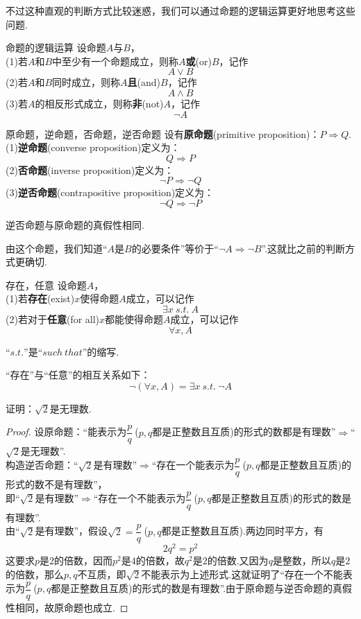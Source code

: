 \documentclass[lang=cn, zihao=4.5]{elegantbook}
\begin{document}
不过这种直观的判断方式比较迷惑，我们可以通过命题的逻辑运算更好地思考这些问题.

\begin{definition}{命题的逻辑运算} %
	设命题$A$与$B$， \\
	(1)若$A$和$B$中至少有一个命题成立，则称$A$\textbf{或}(or)$B$，记作$$A \vee B$$
	(2)若$A$和$B$同时成立，则称$A$\textbf{且}(and)$B$，记作$$A \wedge B$$
	(3)若$A$的相反形式成立，则称\textbf{非}(not)$A$，记作$$\neg A$$
\end{definition}

\begin{definition}{原命题，逆命题，否命题，逆否命题}
	设有\textbf{原命题}(primitive proposition)：$P \Rightarrow Q$. \\
	(1)\textbf{逆命题}(converse proposition)定义为：$$Q \Rightarrow P$$
	(2)\textbf{否命题}(inverse proposition)定义为：$$\neg P \Rightarrow \neg Q$$
	(3)\textbf{逆否命题}(contrapositive proposition)定义为：$$\neg Q \Rightarrow \neg P$$
\end{definition}

\begin{proposition}
	逆否命题与原命题的真假性相同.
\end{proposition}

由这个命题，我们知道“$A$是$B$的必要条件”等价于“$\neg A \Rightarrow \neg B$”.这就比之前的判断方式更确切.

\begin{definition}{存在，任意}
	设命题$A$， \\
	(1)若\textbf{存在}(exist)$x$使得命题$A$成立，可以记作$$\exists x~s.t.~A$$
	(2)若对于\textbf{任意}(for all)$x$都能使得命题$A$成立，可以记作$$\forall x,A$$
\end{definition}
\begin{remark}
	“$s.t.$”是“$such~that$”的缩写.
\end{remark}
\begin{remark}
	“存在”与“任意”的相互关系如下：$$\neg (\forall x,A) = \exists x~s.t.~\neg A$$
\end{remark}


\begin{example}
	证明：$\sqrt{2}$是无理数.
\end{example}
\begin{proof}
	设原命题：“能表示为$\dfrac{p}{q}~$($p,q$都是正整数且互质)的形式的数都是有理数”$\Rightarrow$“$\sqrt{2}$是无理数”. \\
	构造逆否命题：“$\sqrt{2}$是有理数”$\Rightarrow$“存在一个能表示为$\dfrac{p}{q}~$($p,q$都是正整数且互质)的形式的数不是有理数”， \\
	即“$\sqrt{2}$是有理数”$\Rightarrow$“存在一个不能表示为$\dfrac{p}{q}~$($p,q$都是正整数且互质)的形式的数是有理数”. \\
	由“$\sqrt{2}$是有理数”，假设$\sqrt{2}= \dfrac{p}{q}~$($p,q$都是正整数且互质).两边同时平方，有$$2q^2=p^2$$
	这要求$p$是$2$的倍数，因而$p^2$是$4$的倍数，故$q^2$是$2$的倍数.又因为$q$是整数，所以$q$是$2$的倍数，那么$p,q$不互质，即$\sqrt{2}$不能表示为上述形式.这就证明了“存在一个不能表示为$\dfrac{p}{q}~$($p,q$都是正整数且互质)的形式的数是有理数”.由于原命题与逆否命题的真假性相同，故原命题也成立.
\end{proof}
\end{document}
